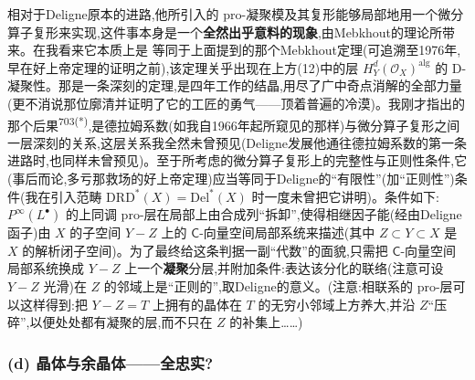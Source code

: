 \noindent 相对于Deligne原本的进路,他所引入的 pro-凝聚模及其复形能够局部地用一个微分算子复形来实现,这件事本身是一个\textbf{全然出乎意料的现象},由Mebkhout的理论所带来。在我看来它本质上是
等同于上面提到的那个Mebkhout定理(可追溯至1976年,早在好上帝定理的证明之前),该定理关乎出现在上方(12)中的层 $H^{d}_{Y}(\mathcal{O}_{X})^{\mathrm{alg}}$ 的 D-凝聚性。那是一条深刻的定理,是四年工作的结晶,用尽了广中奇点消解的全部力量(更不消说那位廓清并证明了它的工匠的勇气——顶着普遍的冷漠)。我刚才指出的那个后果\textsuperscript{703(*)},是德拉姆系数(如我自1966年起所窥见的那样)与微分算子复形之间一层深刻的关系,这层关系我全然未曾预见(Deligne发展他通往德拉姆系数的第一条进路时,也同样未曾预见)。至于所考虑的微分算子复形上的完整性与正则性条件,它(事后而论,多亏那救场的好上帝定理)应当等同于Deligne的“有限性”(加“正则性”)条件(我在引入范畴 $\mathrm{DRD}^{*}(X)=\mathrm{Del}^{*}(X)$ 时一度未曾把它讲明)。条件如下:$P^{\infty}(L^{\bullet})$ 的上同调 pro-层在局部上由合成列“拆卸”,使得相继因子能(经由Deligne函子)由 $X$ 的子空间 $Y-Z$ 上的 $\mathsf{C}$-向量空间局部系统来描述(其中 $Z\subset Y\subset X$ 是 $X$ 的解析闭子空间)。为了最终给这条判据一副“代数”的面貌,只需把 $\mathsf{C}$-向量空间局部系统换成 $Y-Z$ 上一个\textbf{凝聚}分层,并附加条件:表达该分化的联络(注意可设 $Y-Z$ 光滑)在 $Z$ 的邻域上是“正则的”,取Deligne的意义。(注意:相联系的 pro-层可以这样得到:把 $Y-Z=T$ 上拥有的\dmark{}晶体在 $T$ 的无穷小邻域上方养大,并沿 $Z$“压碎”,以便处处都有凝聚的层,而不只在 $Z$ 的补集上……)

\subsubsection*{(d) 晶体与余晶体——全忠实?}


